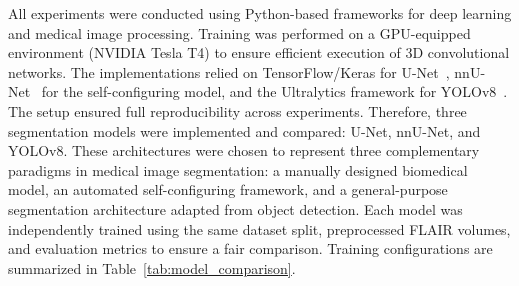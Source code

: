 \documentclass[12pt]{article}
\begin{document}
All experiments were conducted using Python-based frameworks for deep learning and medical image processing. Training was performed on a GPU-equipped environment (NVIDIA Tesla T4) to ensure efficient execution of 3D convolutional networks. The implementations relied on TensorFlow/Keras for U-Net~\cite{ronnebergerUNetConvolutionalNetworks2015,Zhou2018}, nnU-Net~\cite{isenseeAbstractNnUNetSelfadapting2019} for the self-configuring model, and the Ultralytics framework for YOLOv8~\cite{jocherUltralyticsYolov5V702022}. The setup ensured full reproducibility across experiments.
%
Therefore, three segmentation models were implemented and compared: U-Net, nnU-Net, and YOLOv8. These architectures were chosen to represent three complementary paradigms in medical image segmentation: a manually designed biomedical model, an automated self-configuring framework, and a general-purpose segmentation architecture adapted from object detection.
%
Each model was independently trained using the same dataset split, preprocessed FLAIR volumes, and evaluation metrics to ensure a fair comparison. Training configurations are summarized in Table~\ref{tab:model_comparison}.


\end{document}
